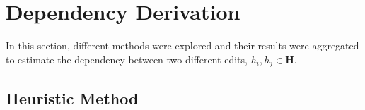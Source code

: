 



\section{Dependency Derivation}

In this section, different methods were explored and their results were aggregated to estimate the dependency between two different edits, $h_i, h_j \in \mathbf{H}$. 


\subsection{Heuristic Method}

